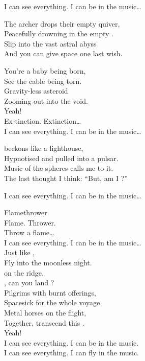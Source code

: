 I can see everything. I can be in the music… \\


The archer drops their empty quiver, \\
Peacefully drowning in the empty . \\
Slip into the vast astral abyss \\
And you can give space one last wish. \\


You're a baby being born, \\
See the cable being torn. \\
Gravity-less asteroid \\
Zooming out into the void. \\
Yeah! \\

Ex-tinction. Extinction… \\

I can see everything. I can be in the music… \\


 beckons like a lighthouse, \\
Hypnotised and pulled into a pulsar. \\
Music of the spheres calls me to it. \\
The last thought I think: ``But, am I ?'' \\


I can see everything. I can be in the music… \\


Flamethrower. \\
Flame. Thrower. \\
Throw a flame… \\

I can see everything. I can be in the music… \\

Just like , \\
Fly into the moonless night. \\
 on the ridge. \\
, can you land ? \\
Pilgrims with burnt offerings, \\
Spacesick for the whole voyage. \\
Metal horses on the flight, \\
Together, transcend this . \\
Yeah! \\

I can see everything. I can be in the music. \\
I can see everything. I can fly  in the music. \\
